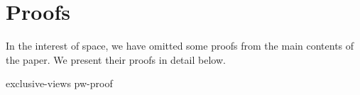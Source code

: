 \section{Proofs}
\label{app:proofs}

In the interest of space, we have omitted some proofs from
the main contents of the paper. 
We present their proofs in detail below.

{exclusive-views}
{pw-proof}

